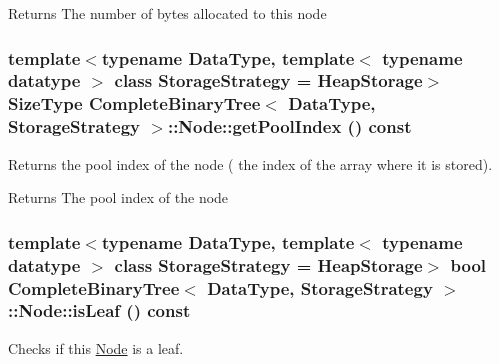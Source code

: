 \begin{DoxyReturn}{Returns}
The number of bytes allocated to this node 
\end{DoxyReturn}
\hypertarget{class_complete_binary_tree_1_1_node_a067ae41ed3433d842176ddd96edbfeb7}{
\subsubsection[{getPoolIndex}]{\setlength{\rightskip}{0pt plus 5cm}template$<$typename DataType, template$<$ typename datatype $>$ class StorageStrategy = HeapStorage$>$ SizeType {\bf CompleteBinaryTree}$<$ DataType, StorageStrategy $>$::Node::getPoolIndex () const}}
\label{class_complete_binary_tree_1_1_node_a067ae41ed3433d842176ddd96edbfeb7}


Returns the pool index of the node ( the index of the array where it is stored). 

\begin{DoxyReturn}{Returns}
The pool index of the node 
\end{DoxyReturn}
\hypertarget{class_complete_binary_tree_1_1_node_addeecc7b908df78a88f1e2b897b39d10}{
\subsubsection[{isLeaf}]{\setlength{\rightskip}{0pt plus 5cm}template$<$typename DataType, template$<$ typename datatype $>$ class StorageStrategy = HeapStorage$>$ bool {\bf CompleteBinaryTree}$<$ DataType, StorageStrategy $>$::Node::isLeaf () const}}
\label{class_complete_binary_tree_1_1_node_addeecc7b908df78a88f1e2b897b39d10}


Checks if this \hyperlink{class_complete_binary_tree_1_1_node}{Node} is a leaf. 

